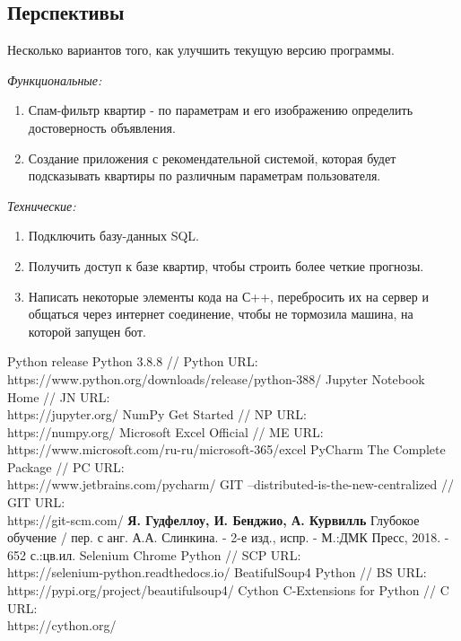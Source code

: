 \documentclass{article}
\begin{document}
		\subsection{Перспективы}
			Несколько вариантов того, как улучшить текущую версию программы.
			
			\vspace{1cm}
			\textit{Функциональные:}
			
			\begin{enumerate}
				\item Спам-фильтр квартир - по параметрам и его изображению определить достоверность объявления.
				\item Создание приложения с рекомендательной системой, которая будет подсказывать квартиры по различным параметрам пользователя.
			\end{enumerate} 
		
			\textit{Технические:}
			\begin{enumerate}
				\item Подключить базу-данных SQL.
				\item Получить доступ к базе квартир, чтобы строить более четкие прогнозы.
				\item Написать некоторые элементы кода на С++, перебросить их на сервер и общаться через интернет соединение, чтобы не тормозила машина, на которой запущен бот.
			\end{enumerate} 
		
		
		
		
		
	\newpage
	\begin{thebibliography}{}
		  Python release Python 3.8.8 // Python URL: \\ https://www.python.org/downloads/release/python-388/ 
		  Jupyter Notebook Home // JN URL: \\ https://jupyter.org/
		  NumPy Get Started // NP URL: \\ https://numpy.org/
		  Microsoft Excel Official // ME URL: \\ https://www.microsoft.com/ru-ru/microsoft-365/excel
		  PyCharm The Complete Package // PC URL: \\ https://www.jetbrains.com/pycharm/
			GIT --distributed-is-the-new-centralized // GIT URL: \\
		https://git-scm.com/
		  \textbf{Я. Гудфеллоу, И. Бенджио, А. Курвилль} Глубокое обучение / пер. с анг. А.А. Слинкина. - 2-е изд., испр. - М.:ДМК Пресс, 2018. - 652 с.:цв.ил. 
		  Selenium Chrome Python // SCP URL: \\
		https://selenium-python.readthedocs.io/
		  BeatifulSoup4 Python // BS URL: \\
		https://pypi.org/project/beautifulsoup4/
		 Cython C-Extensions for Python // C URL: \\
		https://cython.org/
	\end{thebibliography}
\end{document}
